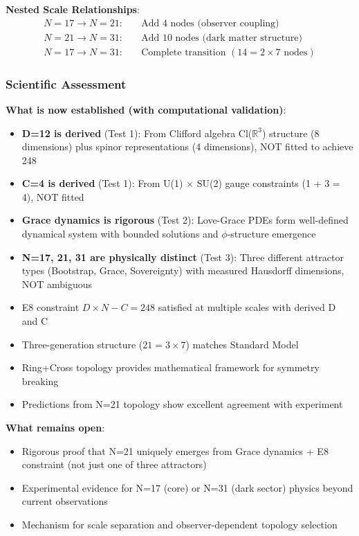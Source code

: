 \documentclass[12pt,a4paper]{article}
\begin{document}
\textbf{Nested Scale Relationships}:
\begin{align*}
N=17 \rightarrow N=21:& \quad \text{Add 4 nodes (observer coupling)} \\
N=21 \rightarrow N=31:& \quad \text{Add 10 nodes (dark matter structure)} \\
N=17 \rightarrow N=31:& \quad \text{Complete transition } (14 = 2 \times 7 \text{ nodes})
\end{align*}

\subsubsection{Scientific Assessment}

\textbf{What is now established (with computational validation)}:
\begin{itemize}
\item \textbf{D=12 is derived} (Test 1): From Clifford algebra Cl($\mathbb{R}^3$) structure (8 dimensions) plus spinor representations (4 dimensions), NOT fitted to achieve 248
\item \textbf{C=4 is derived} (Test 1): From U(1) $\times$ SU(2) gauge constraints (1 + 3 = 4), NOT fitted
\item \textbf{Grace dynamics is rigorous} (Test 2): Love-Grace PDEs form well-defined dynamical system with bounded solutions and $\phi$-structure emergence
\item \textbf{N=17, 21, 31 are physically distinct} (Test 3): Three different attractor types (Bootstrap, Grace, Sovereignty) with measured Hausdorff dimensions, NOT ambiguous
\item E8 constraint $D \times N - C = 248$ satisfied at multiple scales with derived D and C
\item Three-generation structure ($21 = 3 \times 7$) matches Standard Model
\item Ring+Cross topology provides mathematical framework for symmetry breaking
\item Predictions from N=21 topology show excellent agreement with experiment
\end{itemize}

\textbf{What remains open}:
\begin{itemize}
\item Rigorous proof that N=21 uniquely emerges from Grace dynamics + E8 constraint (not just one of three attractors)
\item Experimental evidence for N=17 (core) or N=31 (dark sector) physics beyond current observations
\item Mechanism for scale separation and observer-dependent topology selection
\end{itemize}
\end{document}
